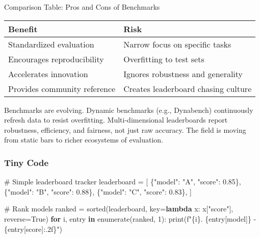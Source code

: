 \documentclass[
  letterpaper,
  DIV=11,
  numbers=noendperiod]{scrreprt}
\newenvironment{Shaded}{\begin{snugshade}}{\end{snugshade}}
\newcommand{\BuiltInTok}[1]{\textcolor[rgb]{0.00,0.23,0.31}{#1}}
\newcommand{\CommentTok}[1]{\textcolor[rgb]{0.37,0.37,0.37}{#1}}
\newcommand{\ControlFlowTok}[1]{\textcolor[rgb]{0.00,0.23,0.31}{\textbf{#1}}}
\newcommand{\DecValTok}[1]{\textcolor[rgb]{0.68,0.00,0.00}{#1}}
\newcommand{\FloatTok}[1]{\textcolor[rgb]{0.68,0.00,0.00}{#1}}
\newcommand{\KeywordTok}[1]{\textcolor[rgb]{0.00,0.23,0.31}{\textbf{#1}}}
\newcommand{\NormalTok}[1]{\textcolor[rgb]{0.00,0.23,0.31}{#1}}
\newcommand{\OperatorTok}[1]{\textcolor[rgb]{0.37,0.37,0.37}{#1}}
\newcommand{\SpecialCharTok}[1]{\textcolor[rgb]{0.37,0.37,0.37}{#1}}
\newcommand{\SpecialStringTok}[1]{\textcolor[rgb]{0.13,0.47,0.30}{#1}}
\newcommand{\StringTok}[1]{\textcolor[rgb]{0.13,0.47,0.30}{#1}}
\newcommand{\VariableTok}[1]{\textcolor[rgb]{0.07,0.07,0.07}{#1}}
\begin{document}
Comparison Table: Pros and Cons of Benchmarks

\begin{longtable}[]{@{}ll@{}}
\toprule\noalign{}
Benefit & Risk \\
\midrule\noalign{}
\endhead
\bottomrule\noalign{}
\endlastfoot
Standardized evaluation & Narrow focus on specific tasks \\
Encourages reproducibility & Overfitting to test sets \\
Accelerates innovation & Ignores robustness and generality \\
Provides community reference & Creates leaderboard chasing culture \\
\end{longtable}

Benchmarks are evolving. Dynamic benchmarks (e.g., Dynabench)
continuously refresh data to resist overfitting. Multi-dimensional
leaderboards report robustness, efficiency, and fairness, not just raw
accuracy. The field is moving from static bars to richer ecosystems of
evaluation.

\subsubsection{Tiny Code}\label{tiny-code-85}

\begin{Shaded}
\begin{Highlighting}[]
\CommentTok{\# Simple leaderboard tracker}
\NormalTok{leaderboard }\OperatorTok{=}\NormalTok{ [}
\NormalTok{    \{}\StringTok{"model"}\NormalTok{: }\StringTok{"A"}\NormalTok{, }\StringTok{"score"}\NormalTok{: }\FloatTok{0.85}\NormalTok{\},}
\NormalTok{    \{}\StringTok{"model"}\NormalTok{: }\StringTok{"B"}\NormalTok{, }\StringTok{"score"}\NormalTok{: }\FloatTok{0.88}\NormalTok{\},}
\NormalTok{    \{}\StringTok{"model"}\NormalTok{: }\StringTok{"C"}\NormalTok{, }\StringTok{"score"}\NormalTok{: }\FloatTok{0.83}\NormalTok{\},}
\NormalTok{]}

\CommentTok{\# Rank models}
\NormalTok{ranked }\OperatorTok{=} \BuiltInTok{sorted}\NormalTok{(leaderboard, key}\OperatorTok{=}\KeywordTok{lambda}\NormalTok{ x: x[}\StringTok{"score"}\NormalTok{], reverse}\OperatorTok{=}\VariableTok{True}\NormalTok{)}
\ControlFlowTok{for}\NormalTok{ i, entry }\KeywordTok{in} \BuiltInTok{enumerate}\NormalTok{(ranked, }\DecValTok{1}\NormalTok{):}
    \BuiltInTok{print}\NormalTok{(}\SpecialStringTok{f"}\SpecialCharTok{\{}\NormalTok{i}\SpecialCharTok{\}}\SpecialStringTok{. }\SpecialCharTok{\{}\NormalTok{entry[}\StringTok{\textquotesingle{}model\textquotesingle{}}\NormalTok{]}\SpecialCharTok{\}}\SpecialStringTok{ {-} }\SpecialCharTok{\{}\NormalTok{entry[}\StringTok{\textquotesingle{}score\textquotesingle{}}\NormalTok{]}\SpecialCharTok{:.2f\}}\SpecialStringTok{"}\NormalTok{)}
\end{Highlighting}
\end{Shaded}
\end{document}
